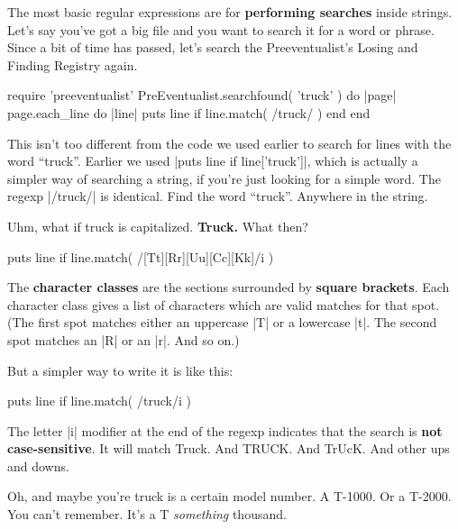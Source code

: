 \documentclass[12pt,twoside]{report}
\begin{document}
The most basic regular expressions are for {\bf performing searches}
inside strings.  Let's say you've got a big file and you want to
search it for a word or phrase.  Since a bit of time has passed, let's
search the Preeventualist's Losing and Finding Registry again.


\begin{rubycode}

 require 'preeventualist'
 PreEventualist.searchfound( 'truck' ) do |page|
   page.each_line do |line|
     puts line if line.match( /truck/ )
   end
 end

\end{rubycode}


This isn't too different from the code we used earlier to search for
lines with the word ``truck''.  Earlier we used
\rubyinline|puts line if line['truck']|, which is
actually a simpler way of searching a string, if you're just looking
for a simple word.  The regexp \rubyinline|/truck/| is
identical.  Find the word ``truck''.  Anywhere in the string.

Uhm, what if truck is capitalized.  {\bf Truck.}  What then?


\begin{rubycode}

 puts line if line.match( /[Tt][Rr][Uu][Cc][Kk]/i )

\end{rubycode}


The {\bf character classes} are the sections surrounded by {\bf square
  brackets}.  Each character class gives a list of characters which
are valid matches for that spot.  (The first spot matches either an
uppercase \rubyinline|T| or a lowercase
\rubyinline|t|.  The second spot matches an
\rubyinline|R| or an \rubyinline|r|.
And so on.)

But a simpler way to write it is like this:


\begin{rubycode}

 puts line if line.match( /truck/i )

\end{rubycode}


The letter \rubyinline|i| modifier at the end of the
regexp indicates that the search is {\bf not case-sensitive}.  It will
match Truck.  And TRUCK.  And TrUcK.  And other ups and downs.

Oh, and maybe you're truck is a certain model number.  A T-1000.  Or a
T-2000.  You can't remember.  It's a T {\em something} thousand.
\end{document}
